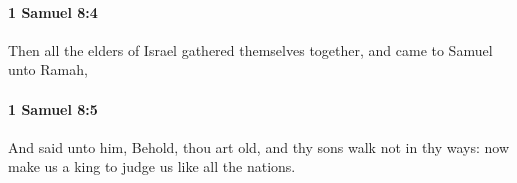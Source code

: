 		\paragraph{1 Samuel 8:4} %
			\label{1SAMUEL-8-4}

			Then all the elders of Israel gathered themselves together, and came to Samuel unto Ramah,


		\paragraph{1 Samuel 8:5} %
			\label{1SAMUEL-8-5}

			And said unto him, Behold, thou art old, and thy sons walk not in thy ways: now make us a king to judge us like all the nations.


